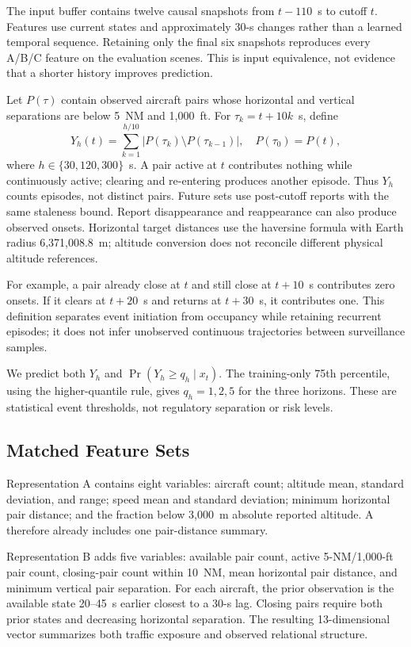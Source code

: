 \documentclass[10pt,journal,letterpaper]{IEEEtran}
\begin{document}
The input buffer contains twelve causal snapshots from $t-110$~s to cutoff $t$. Features use current states and approximately 30-s changes rather than a learned temporal sequence. Retaining only the final six snapshots reproduces every A/B/C feature on the evaluation scenes. This is input equivalence, not evidence that a shorter history improves prediction.

Let $P(\tau)$ contain observed aircraft pairs whose horizontal and vertical separations are below 5~NM and 1,000~ft. For $\tau_k=t+10k$~s, define
\begin{equation}
Y_h(t)=\sum_{k=1}^{h/10}|P(\tau_k)\setminus P(\tau_{k-1})|,
\quad P(\tau_0)=P(t),
\label{eq:onset}
\end{equation}
where $h\in\{30,120,300\}$~s. A pair active at $t$ contributes nothing while continuously active; clearing and re-entering produces another episode. Thus $Y_h$ counts episodes, not distinct pairs. Future sets use post-cutoff reports with the same staleness bound. Report disappearance and reappearance can also produce observed onsets. Horizontal target distances use the haversine formula with Earth radius 6,371,008.8~m; altitude conversion does not reconcile different physical altitude references.

For example, a pair already close at $t$ and still close at $t+10$~s contributes zero onsets. If it clears at $t+20$~s and returns at $t+30$~s, it contributes one. This definition separates event initiation from occupancy while retaining recurrent episodes; it does not infer unobserved continuous trajectories between surveillance samples.

We predict both $Y_h$ and $\Pr(Y_h\geq q_h\mid x_t)$. The training-only 75th percentile, using the higher-quantile rule, gives $q_h=1,2,5$ for the three horizons. These are statistical event thresholds, not regulatory separation or risk levels.

\subsection{Matched Feature Sets}
Representation A contains eight variables: aircraft count; altitude mean, standard deviation, and range; speed mean and standard deviation; minimum horizontal pair distance; and the fraction below 3,000~m absolute reported altitude. A therefore already includes one pair-distance summary.

Representation B adds five variables: available pair count, active 5-NM/1,000-ft pair count, closing-pair count within 10~NM, mean horizontal pair distance, and minimum vertical pair separation. For each aircraft, the prior observation is the available state 20--45~s earlier closest to a 30-s lag. Closing pairs require both prior states and decreasing horizontal separation. The resulting 13-dimensional vector summarizes both traffic exposure and observed relational structure.
\end{document}
